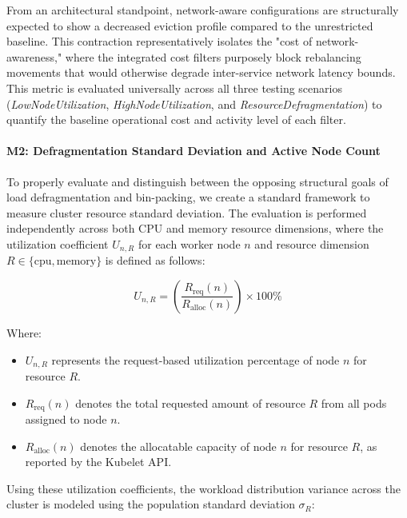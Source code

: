 From an architectural standpoint, network-aware configurations are structurally expected to show a decreased eviction profile compared to the unrestricted baseline. This contraction representatively isolates the "cost of network-awareness," where the integrated cost filters purposely block rebalancing movements that would otherwise degrade inter-service network latency bounds. This metric is evaluated universally across all three testing scenarios (\textit{LowNodeUtilization}, \textit{HighNodeUtilization}, and \textit{ResourceDefragmentation}) to quantify the baseline operational cost and activity level of each filter.

\paragraph{M2: Defragmentation Standard Deviation and Active Node Count}
\label{subsubsec:netaware4_evaluationmetrics2}
To properly evaluate and distinguish between the opposing structural goals of load defragmentation and bin-packing, we create a standard framework to measure cluster resource standard deviation. The evaluation is performed independently across both CPU and memory resource dimensions, where the utilization coefficient \(U_{n,R}\) for each worker node \(n\) and resource dimension \(R \in \{\text{cpu}, \text{memory}\}\) is defined as follows:

\[
U_{n,R}
=
\left(
\frac{R_{\text{req}}(n)}
{R_{\text{alloc}}(n)}
\right)
\times 100\%
\]

Where:

\begin{itemize}
    \item \(U_{n,R}\) represents the request-based utilization percentage of node \(n\) for resource \(R\).

    \item \(R_{\text{req}}(n)\) denotes the total requested amount of resource \(R\) from all pods assigned to node \(n\).

    \item \(R_{\text{alloc}}(n)\) denotes the allocatable capacity of node \(n\) for resource \(R\), as reported by the Kubelet API.
\end{itemize}

Using these utilization coefficients, the workload distribution variance across the cluster is modeled using the population standard deviation \(\sigma_R\):

